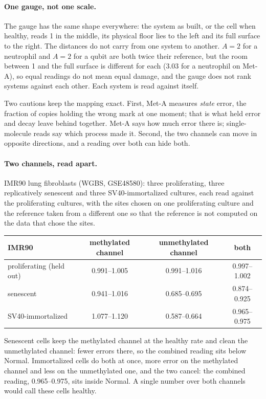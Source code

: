 \paragraph{One gauge, not one scale.} The gauge has the same shape everywhere: the system as built, or the cell when healthy, reads 1 in the
middle, its physical floor lies to the left and its full surface to the right. The distances do not carry from one system to another. $A=2$
for a neutrophil and $A=2$ for a qubit are both twice their reference, but the room between 1 and the full surface is different for each
(3.03 for a neutrophil on Met-A), so equal readings do not mean equal damage, and the gauge does not rank systems against each other. Each
system is read against itself. \derived

Two cautions keep the mapping exact. First, Met-A measures \emph{state} error, the fraction of copies holding the wrong mark at one moment;
that is what held error and decay leave behind together. Met-A says how much error there is; single-molecule reads say which process made
it. Second, the two channels can move in opposite directions, and a reading over both can hide both.

\paragraph{Two channels, read apart.} IMR90 lung fibroblasts (WGBS, GSE48580): three proliferating, three replicatively senescent and three
SV40-immortalized cultures, each read against the proliferating cultures, with the sites chosen on one proliferating culture and the
reference taken from a different one so that the reference is not computed on the data that chose the sites. \measured
\begin{center}\small
\begin{tabular}{@{}lccc@{}}\toprule
IMR90 & methylated channel & unmethylated channel & both \\\midrule
proliferating (held out) & 0.991--1.005 & 0.991--1.016 & 0.997--1.002 \\
senescent & 0.941--1.016 & 0.685--0.695 & 0.874--0.925 \\
SV40-immortalized & 1.077--1.120 & 0.587--0.664 & 0.965--0.975 \\\bottomrule
\end{tabular}
\end{center}
Senescent cells keep the methylated channel at the healthy rate and clean the unmethylated channel: fewer errors there, so the combined
reading sits below Normal. Immortalized cells do both at once, more error on the methylated channel and less on the unmethylated one, and the
two cancel: the combined reading, 0.965--0.975, sits inside Normal. A single number over both channels would call these cells healthy.

